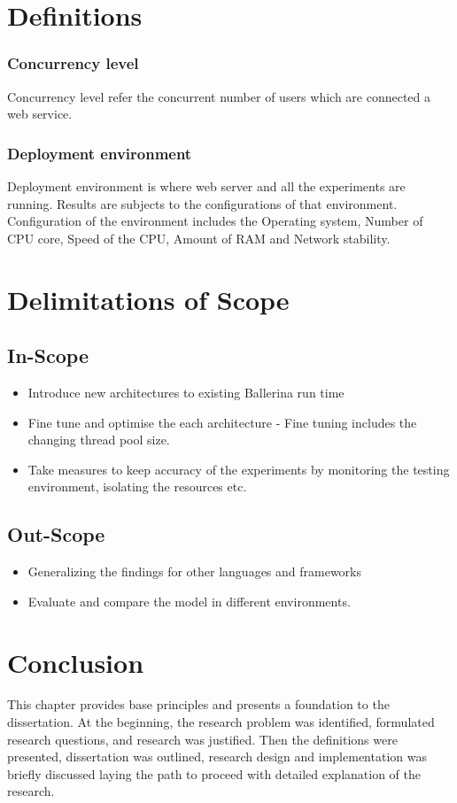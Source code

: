 \section{Definitions}

\subsubsection{Concurrency level}

Concurrency level refer the concurrent number of users which are connected a web service.

\subsubsection{Deployment environment}

Deployment environment is where web server and all the experiments are running. Results are subjects to the configurations of that environment. Configuration of the environment includes the Operating system, Number of CPU core, Speed of the CPU, Amount of RAM and Network stability.

\section{Delimitations of Scope}

\subsection{In-Scope}

\begin{itemize}
	\item Introduce new architectures to existing Ballerina run time
	\item Fine tune and optimise the each architecture - Fine tuning includes the changing thread pool size.
	\item Take measures to keep accuracy of the experiments by monitoring the testing environment, isolating the resources etc.
\end{itemize}

\subsection{Out-Scope}

\begin{itemize}
	\item Generalizing the findings for other languages and frameworks
	\item Evaluate and compare the model in different environments.
\end{itemize}

\section{Conclusion}	

This chapter provides base principles and presents a foundation to the dissertation. At the beginning, the research problem was identified, formulated research questions, and research was justified. Then the definitions were presented, dissertation was outlined, research design and implementation was briefly discussed laying the path to proceed with detailed explanation of the research.
